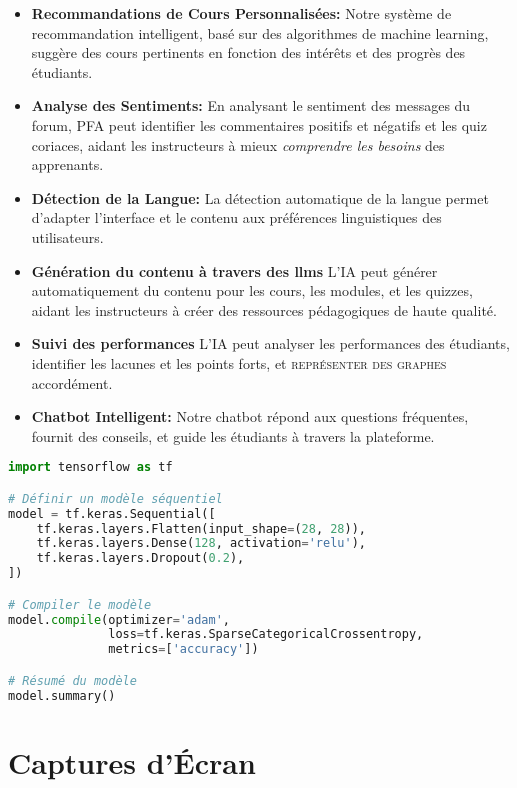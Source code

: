 \begin{itemize}
    \item \textbf{Recommandations de Cours Personnalisées:} Notre système de recommandation intelligent, basé sur des algorithmes de machine learning, suggère des cours pertinents en fonction des intérêts et des progrès des étudiants.
    \item \textbf{Analyse des Sentiments:} En analysant le sentiment des messages du forum, PFA peut identifier les commentaires positifs et négatifs et les quiz coriaces, aidant les instructeurs à mieux \textit{comprendre les besoins} des apprenants.
    \item \textbf{Détection de la Langue:} La détection automatique de la langue permet d'adapter l'interface et le contenu aux préférences linguistiques des utilisateurs.
    \item \textbf{Génération du contenu à travers des \gls{llm}s} L'IA peut générer automatiquement du contenu pour les cours, les modules, et les quizzes, aidant les instructeurs à créer des ressources pédagogiques de haute qualité.
    \item \textbf{Suivi des performances} L'IA peut analyser les performances des étudiants, identifier les lacunes et les points forts, et \textsc{représenter des graphes} accordément.
    \item \textbf{Chatbot Intelligent:} Notre chatbot répond aux questions fréquentes, fournit des conseils, et guide les étudiants à travers la plateforme.
\end{itemize}

\begin{lstlisting}[language=Python, caption={Exemple de Code Python Utilisant TensorFlow}, label={lst:tensorflow_example}, basicstyle=\ttfamily, keywordstyle=\color{blue}, commentstyle=\color{green}, stringstyle=\color{red}]
import tensorflow as tf

# Définir un modèle séquentiel
model = tf.keras.Sequential([
    tf.keras.layers.Flatten(input_shape=(28, 28)),
    tf.keras.layers.Dense(128, activation='relu'),
    tf.keras.layers.Dropout(0.2),
])

# Compiler le modèle
model.compile(optimizer='adam',
              loss=tf.keras.SparseCategoricalCrossentropy,
              metrics=['accuracy'])

# Résumé du modèle
model.summary()
\end{lstlisting}

\section{Captures d'Écran}

